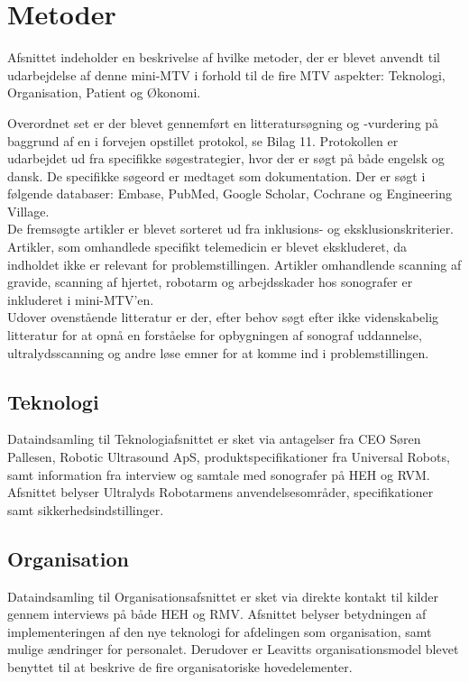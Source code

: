 \chapter{Metoder}
Afsnittet indeholder en beskrivelse af hvilke metoder, der er blevet anvendt til udarbejdelse af denne mini-MTV i forhold til de fire MTV aspekter: Teknologi, Organisation, Patient og Økonomi.

Overordnet set er der blevet gennemført en litteratursøgning og -vurdering på baggrund af en i forvejen opstillet protokol, se Bilag 11. Protokollen er udarbejdet ud fra specifikke søgestrategier, hvor der er søgt på både engelsk og dansk. De specifikke søgeord er medtaget som dokumentation. Der er søgt i følgende databaser: Embase, PubMed, Google Scholar, Cochrane og Engineering Village. \\
De fremsøgte artikler er blevet sorteret ud fra inklusions- og eksklusionskriterier. Artikler, som omhandlede specifikt telemedicin er blevet ekskluderet, da indholdet ikke er relevant for problemstillingen. Artikler omhandlende scanning af gravide, scanning af hjertet, robotarm og arbejdsskader hos sonografer er inkluderet i mini-MTV’en.\\
Udover ovenstående litteratur er der, efter behov søgt efter ikke videnskabelig litteratur for at opnå en forståelse for opbygningen af sonograf uddannelse, ultralydsscanning og andre løse emner for at komme ind i problemstillingen. 

\section{Teknologi}
Dataindsamling til Teknologiafsnittet er sket via antagelser fra CEO Søren Pallesen, Robotic Ultrasound ApS, produktspecifikationer fra Universal Robots, samt information fra interview og samtale med sonografer på HEH og RVM. Afsnittet belyser Ultralyds Robotarmens anvendelsesområder, specifikationer samt sikkerhedsindstillinger.

\section{Organisation}
Dataindsamling til Organisationsafsnittet er sket via direkte kontakt til kilder gennem interviews på både HEH og RMV. Afsnittet belyser betydningen af implementeringen af den nye teknologi for afdelingen som organisation, samt mulige ændringer for personalet. Derudover er Leavitts organisationsmodel blevet benyttet til at beskrive de fire organisatoriske hovedelementer.

